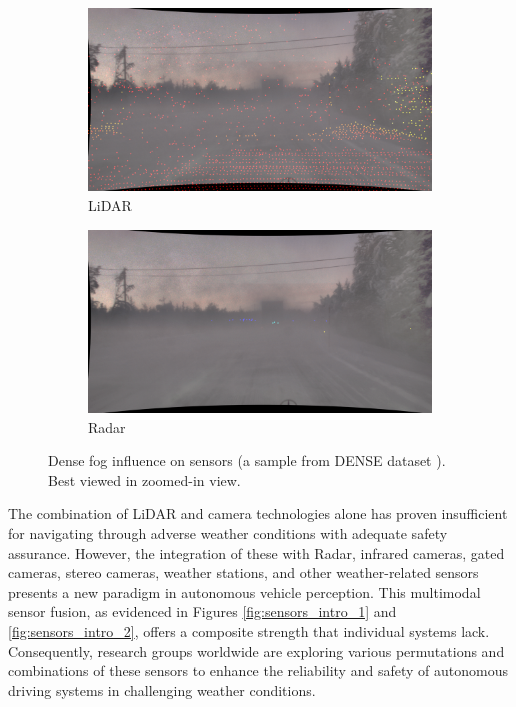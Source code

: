 \documentclass[report.tex]{subfiles}
\begin{document}
\begin{figure}[ht]
        \begin{subfigure}{.5\textwidth}
            \centering
            \includegraphics[width=.9\linewidth]{images/adverse_weather_influence_on_sensor/LiDAR_1.png}
            \caption{LiDAR}
            \label{fig:LiDAR_in_fog}
        \end{subfigure}%
        \begin{subfigure}{.5\textwidth}
            \centering
            \includegraphics[width=.9\linewidth]{images/adverse_weather_influence_on_sensor/Radar_1.png}
            \caption{Radar}
            \label{fig:Radar_in_fog}
        \end{subfigure}
        
        \caption{\centering Dense fog influence on sensors (a sample from DENSE dataset \cite{bijelic2020seeing}). Best viewed in zoomed-in view.}
        \label{fig:adverse_weather_influence_on_sensor}
    \end{figure}
    
    The combination of LiDAR and camera technologies alone has proven insufficient for navigating through adverse weather conditions with adequate safety assurance. However, the integration of these with Radar, infrared cameras, gated cameras, stereo cameras, weather stations, and other weather-related sensors presents a new paradigm in autonomous vehicle perception. This multimodal sensor fusion, as evidenced in Figures \ref{fig:sensors_intro_1} and \ref{fig:sensors_intro_2}, offers a composite strength that individual systems lack. Consequently, research groups worldwide are exploring various permutations and combinations of these sensors to enhance the reliability and safety of autonomous driving systems in challenging weather conditions.
\end{document}
